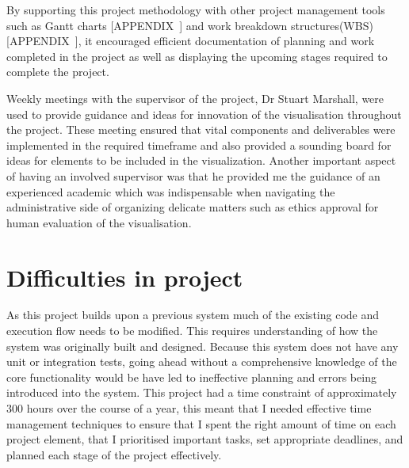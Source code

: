 By supporting this project methodology with other project management tools such as Gantt charts [APPENDIX~] and work breakdown structures(WBS) [APPENDIX~], it encouraged efficient documentation of planning and work completed in the project as well as displaying the upcoming stages required to complete the project.

Weekly meetings with the supervisor of the project, Dr Stuart Marshall, were used to provide guidance and ideas for innovation of the visualisation throughout the project. These meeting ensured that vital components and deliverables were implemented in the required timeframe and also provided a sounding board for ideas for elements to be included in the visualization. Another important aspect of having an involved supervisor was that he provided me the guidance of an experienced academic which was indispensable when navigating the administrative side of organizing delicate matters such as ethics approval for human evaluation of the visualisation.

\section{Difficulties in project}
As this project builds upon a previous system much of the existing code and execution flow needs to be modified. This requires understanding of how the system was originally built and designed. Because this system does not have any unit or integration tests, going ahead without a comprehensive knowledge of the core functionality would be have led to ineffective planning and errors being introduced into the system.
This project had a time constraint of approximately 300 hours over the course of a year, this meant that I needed effective time management techniques to ensure that I spent the right amount of time on each project element, that I prioritised important tasks, set appropriate deadlines, and planned each stage of the project effectively.
